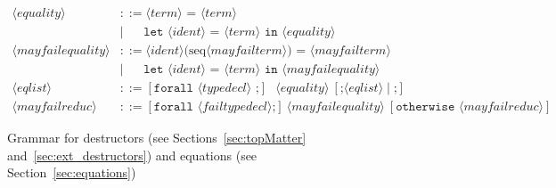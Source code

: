 \documentclass{book}
\newcommand{\nonterm}[1]{\langle\mathit{#1}\rangle}
\newcommand{\seq}[1]{\textrm{seq}\nonterm{#1}}
\begin{document}
\begin{figure}
\begin{align*}
\nonterm{equality} &::= \nonterm{term}\texttt{ = }\nonterm{term} \\
&\mid\phantom{:=} \texttt{let } \nonterm{ident}\texttt{ = }\nonterm{term} \texttt{ in }\nonterm{equality}\\ 
\nonterm{mayfailequality} &::= \nonterm{ident}\texttt{(}\seq{mayfailterm}\texttt{)}\texttt{ = }\nonterm{mayfailterm} \\ 
&\mid\phantom{:=} \texttt{let } \nonterm{ident}\texttt{ = }\nonterm{term} \texttt{ in }\nonterm{mayfailequality}\\
\nonterm{eqlist} &::= [\texttt{forall }\nonterm{typedecl}\textrm{ ;}]\textrm{ }\nonterm{equality}\ [\texttt{;}\nonterm{eqlist} \mid \texttt{;}]\\
\nonterm{mayfailreduc} &::=
	[\texttt{forall }\nonterm{failtypedecl}\texttt{;}]\ \nonterm{mayfailequality}\ [\texttt{otherwise }\nonterm{mayfailreduc}]
\end{align*}
\caption{Grammar for destructors (see Sections~\ref{sec:topMatter} and~\ref{sec:ext_destructors}) and equations (see Section~\ref{sec:equations})}
\label{fig:grammarReducEquation}
\end{figure}

\end{document}
